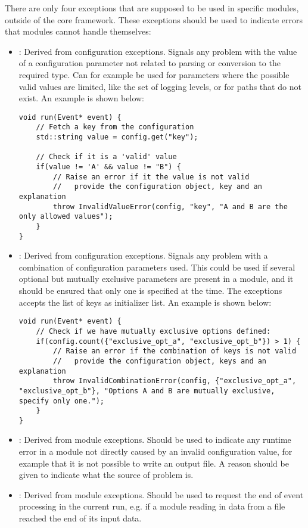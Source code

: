 There are only four exceptions that are supposed to be used in specific modules, outside of the core framework.
These exceptions should be used to indicate errors that modules cannot handle themselves:
\begin{itemize}
\item {}: Derived from configuration exceptions.
Signals any problem with the value of a configuration parameter not related to parsing or conversion to the required type.
Can for example be used for parameters where the possible valid values are limited, like the set of logging levels, or for paths that do not exist.
An example is shown below:
\begin{verbatim}
void run(Event* event) {
    // Fetch a key from the configuration
    std::string value = config.get("key");

    // Check if it is a 'valid' value
    if(value != 'A' && value != "B") {
        // Raise an error if it the value is not valid
        //   provide the configuration object, key and an explanation
        throw InvalidValueError(config, "key", "A and B are the only allowed values");
    }
}
\end{verbatim}
\item {}: Derived from configuration exceptions.
Signals any problem with a combination of configuration parameters used.
This could be used if several optional but mutually exclusive parameters are present in a module, and it should be ensured that only one is specified at the time.
The exceptions accepts the list of keys as initializer list.
An example is shown below:
\begin{verbatim}
void run(Event* event) {
    // Check if we have mutually exclusive options defined:
    if(config.count({"exclusive_opt_a", "exclusive_opt_b"}) > 1) {
        // Raise an error if the combination of keys is not valid
        //   provide the configuration object, keys and an explanation
        throw InvalidCombinationError(config, {"exclusive_opt_a", "exclusive_opt_b"}, "Options A and B are mutually exclusive, specify only one.");
    }
}
\end{verbatim}

\item {}: Derived from module exceptions.
Should be used to indicate any runtime error in a module not directly caused by an invalid configuration value, for example that it is not possible to write an output file.
A reason should be given to indicate what the source of problem is.
\item {}: Derived from module exceptions.
Should be used to request the end of event processing in the current run, e.g. if a module reading in data from a file reached the end of its input data.
\end{itemize}

